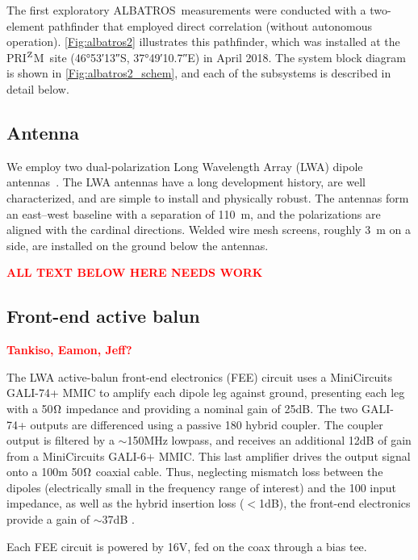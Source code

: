\documentclass{ws-jai}
\def\albatros{ALBATROS}
\def\prizm{PRI$^{\rm Z}$M}
\newcommand{\attention}[1]{\textcolor{red}{\bf {#1}}}
\begin{document}
The first exploratory \albatros\ measurements were conducted with a
two-element pathfinder that employed direct correlation (without
autonomous operation).  \autoref{Fig:albatros2} illustrates this
pathfinder, which was installed at the \prizm\ site (\ang{46;53;13}S,
\ang{37;49;10.7}E) in April 2018.  The system block diagram is shown
in \autoref{Fig:albatros2_schem}, and each of the subsystems is
described in detail below.

\subsection{Antenna}	
We employ two dual-polarization Long Wavelength Array (LWA) dipole
antennas~\citep{Memo28}.  The LWA antennas have a long development
history, are well characterized, and are simple to install and
physically robust.  The antennas form an east--west baseline with a
separation of \SI{110}{m}, and the polarizations are aligned with the
cardinal directions.  Welded wire mesh screens, roughly 3~m on a side,
are installed on the ground below the antennas.

\attention{ALL TEXT BELOW HERE NEEDS WORK}

\subsection{Front-end active balun}
\attention{Tankiso, Eamon, Jeff?} \\
\label{section:FEE}

The LWA active-balun front-end electronics (FEE) circuit uses a MiniCircuits GALI-74+ MMIC 
to amplify each dipole leg against ground, presenting each leg with a 50$\ohm$ impedance 
and providing a nominal gain of 25dB. The two GALI-74+ outputs are differenced using a 
passive {180\degree} hybrid coupler. The coupler output is filtered by a $\sim$150MHz lowpass, 
and receives an additional 12dB of gain from a MiniCircuits GALI-6+ MMIC. This last amplifier 
drives the output signal onto a 100m 50$\ohm$ coaxial cable. Thus, neglecting mismatch loss 
between the dipoles (electrically small in the frequency range of interest) and the 100{\ohm} 
input impedance, as well as the hybrid insertion loss ($<$1dB), the front-end electronics 
provide a gain of $\sim$37dB \cite{2012PASP..124.1090H}. 

Each FEE circuit is powered by 16V, fed on the coax through a bias tee.

\end{document}
